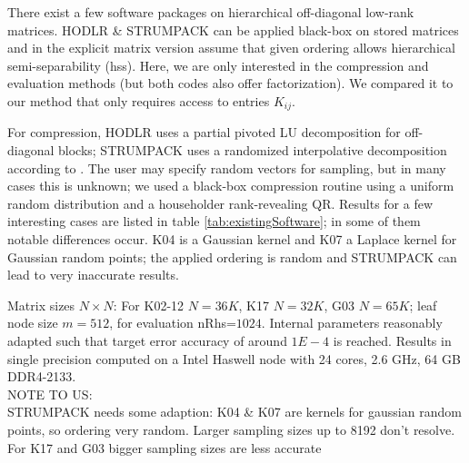 %
There exist a few software packages on hierarchical off-diagonal low-rank
matrices. HODLR \cite{ambikasaran2013mathcal} \& STRUMPACK
\cite{rouet-li-e16} 
can be applied black-box on stored matrices and in the explicit matrix version assume that given ordering allows hierarchical semi-separability (hss). Here, we are only interested in the compression and evaluation methods (but both codes also offer factorization). We compared it to our method that only requires access to entries $K_{ij}$.

For compression, HODLR uses a partial pivoted LU decomposition for off-diagonal blocks; STRUMPACK uses a randomized interpolative decomposition according to \cite{liberty2007randomized}. The user may specify random vectors for sampling, but in many cases this is unknown; we used a black-box compression routine using a uniform random distribution and a householder rank-revealing QR. Results for a few interesting cases are listed in table \ref{tab:existingSoftware}; in some of them notable differences occur. K04 is a Gaussian kernel and K07 a Laplace kernel for Gaussian random points; the applied ordering is random and STRUMPACK can lead to very inaccurate results. 

\begin{table}

\caption{ Matrix sizes $N\times N$: For K02-12 $N=36K$, K17 $N=32K$, G03 $N=65K$; leaf node size $m=512$, for evaluation nRhs=$1024$. Internal parameters reasonably adapted such that target error accuracy of around $1E-4$ is reached. 
Results in single precision computed on a Intel Haswell node with 24 cores, 2.6 GHz, 64 GB DDR4-2133.\\
NOTE TO US: \\
STRUMPACK needs some adaption: K04 \& K07 are kernels for gaussian random points, so ordering very random. Larger sampling sizes up to 8192 don't resolve. For K17 and G03 bigger sampling sizes are less accurate }
\label{tab:existingSoftware}
\end{table}
